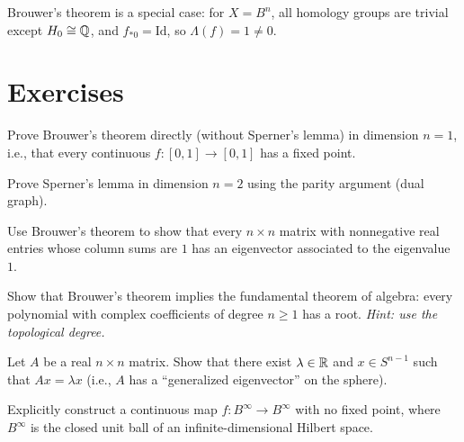 \begin{remark}
Brouwer's theorem is a special case: for $X = B^n$, all homology groups are
trivial except $H_0 \cong \mathbb{Q}$, and $f_{*0} = \mathrm{Id}$, so
$\Lambda(f) = 1 \neq 0$.
\end{remark}

\section{Exercises}

\begin{exercise}
Prove Brouwer's theorem directly (without Sperner's lemma) in dimension
$n = 1$, i.e., that every continuous $f : [0,1] \to [0,1]$ has a fixed point.
\end{exercise}

\begin{exercise}
Prove Sperner's lemma in dimension $n = 2$ using the parity argument (dual
graph).
\end{exercise}

\begin{exercise}
Use Brouwer's theorem to show that every $n \times n$ matrix with nonnegative
real entries whose column sums are $1$ has an eigenvector associated to the
eigenvalue $1$.
\end{exercise}

\begin{exercise}
Show that Brouwer's theorem implies the fundamental theorem of algebra: every
polynomial with complex coefficients of degree $n \geq 1$ has a root.
\textit{Hint: use the topological degree.}
\end{exercise}

\begin{exercise}
Let $A$ be a real $n \times n$ matrix. Show that there exist $\lambda \in \mathbb{R}$
and $x \in S^{n-1}$ such that $Ax = \lambda x$ (i.e., $A$ has a ``generalized
eigenvector'' on the sphere).
\end{exercise}

\begin{exercise}
Explicitly construct a continuous map $f : B^\infty \to B^\infty$ with no fixed
point, where $B^\infty$ is the closed unit ball of an infinite-dimensional
Hilbert space.
\end{exercise}

